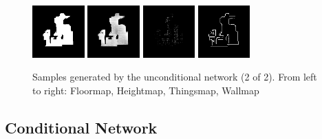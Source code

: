 \begin{figure}[h!]
\begin{minipage}[b]{\linewidth}
	\begin{center}
		\includegraphics[width=2cm]{figures/results/samples/uncond/sample8_map_floormap_generated.png}
		\includegraphics[width=2cm]{figures/results/samples/uncond/sample8_map_heightmap_generated.png}
		\includegraphics[width=2cm]{figures/results/samples/uncond/sample8_map_thingsmap_generated.png}
		\includegraphics[width=2cm]{figures/results/samples/uncond/sample8_map_wallmap_generated.png}
	\end{center}

\end{minipage}
\caption[Samples Generated by the Unconditional network (2 of 2)]{Samples generated by the unconditional network (2 of 2). From left to right: Floormap, Heightmap, Thingsmap, Wallmap}
\label{fig:samples-uncond-2}
\end{figure}

\FloatBarrier
\subsection{Conditional Network}
